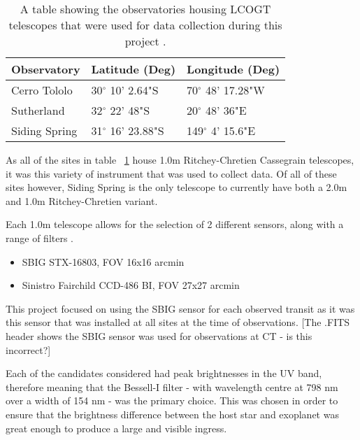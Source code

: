 \documentclass[twoside]{article}
\begin{document}
\begin{multicols}{2}
\begin{table}[H]
    \centering
    \begin{tabular}{ | l | l | l | }
    \hline \hline
    Observatory & Latitude (Deg) & Longitude (Deg)       \\ \hline \hline
    Cerro Tololo    & 30$^\circ$ 10' 2.64"S & 70$^\circ$ 48' 17.28"W  \\
    Sutherland   & 32$^\circ$ 22' 48"S & 20$^\circ$ 48' 36"E  \\
    Siding Spring  & 31$^\circ$ 16' 23.88"S & 149$^\circ$ 4' 15.6"E \\
    \hline
    \end{tabular}
    \caption{A table showing the observatories housing LCOGT telescopes that were used for data collection during this project \citep{sites}.}
    \label{observatory}
\end{table}

As all of the sites in table ~\ref{observatory} house 1.0m Ritchey-Chretien Cassegrain telescopes, it was this variety of instrument that was used to collect data. Of all of these sites however, Siding Spring is the only telescope to currently have both a 2.0m and 1.0m Ritchey-Chretien variant. 

Each 1.0m telescope allows for the selection of 2 different sensors, along with a range of filters \citep{1m}.

\begin{itemize}[H]

  \item SBIG STX-16803, FOV 16x16 arcmin
  \item Sinistro Fairchild CCD-486 BI, FOV 27x27 arcmin

\end{itemize} 

This project focused on using the SBIG sensor for each observed transit as it was this sensor that was installed at all sites at the time of observations. [The .FITS header shows the SBIG sensor was used for observations at CT - is this incorrect?]

Each of the candidates considered had peak brightnesses in the UV band, therefore meaning that the Bessell-I filter - with wavelength centre at 798 nm over a width of 154 nm - was the primary choice. This was chosen in order to ensure that the brightness difference between the host star and exoplanet was great enough to produce a large and visible ingress.



\end{multicols}
\end{document}
